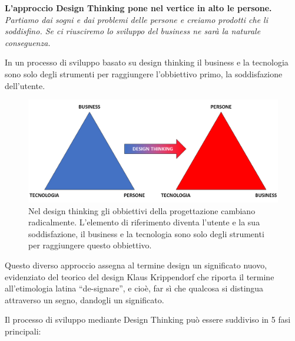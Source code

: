 \textbf{L’approccio Design Thinking pone nel vertice in alto le persone.}\\

\textit{Partiamo dai sogni e dai problemi delle persone e creiamo prodotti che li soddisfino. Se ci riusciremo lo sviluppo del business ne sarà la naturale conseguenza.} 

In un processo di sviluppo basato su design thinking il business e la tecnologia sono solo degli strumenti per raggiungere l'obbiettivo primo, la soddisfazione dell'utente.

\begin{figure}[!h]
	\centering
	\includegraphics[width=\textwidth]{immagini/des_think.png}
	\caption{Nel design thinking gli obbiettivi della progettazione cambiano radicalmente. L'elemento di riferimento diventa l'utente e la sua soddisfazione, il business e la tecnologia sono solo degli strumenti per raggiungere questo obbiettivo.}
	\label{fig:dt_piramide}
\end{figure}

Questo diverso approccio assegna al termine design un significato nuovo, evidenziato del teorico del design Klaus Krippendorf che riporta il termine all’etimologia latina “de-signare”, e cioè, far sì che qualcosa si distingua attraverso un segno, dandogli un significato. 

Il processo di sviluppo mediante Design Thinking può essere suddiviso in 5 fasi principali:

